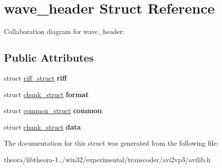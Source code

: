 \hypertarget{structwave__header}{\section{wave\+\_\+header Struct Reference}
\label{structwave__header}
}


Collaboration diagram for wave\+\_\+header\+:
\subsection*{Public Attributes}
\begin{DoxyCompactItemize}
\item 
\hypertarget{structwave__header_a7bcc39762c71ac426cbde1628592a3b0}{struct \hyperlink{structriff__struct}{riff\+\_\+struct} {\bfseries riff}}\label{structwave__header_a7bcc39762c71ac426cbde1628592a3b0}

\item 
\hypertarget{structwave__header_a9ad954d20b73b8a7f30b252fd6962f14}{struct \hyperlink{structchunk__struct}{chunk\+\_\+struct} {\bfseries format}}\label{structwave__header_a9ad954d20b73b8a7f30b252fd6962f14}

\item 
\hypertarget{structwave__header_a468da493bc40d67b163d9e33045c612e}{struct \hyperlink{structcommon__struct}{common\+\_\+struct} {\bfseries common}}\label{structwave__header_a468da493bc40d67b163d9e33045c612e}

\item 
\hypertarget{structwave__header_a69914f046c038e5b16634f82c383661c}{struct \hyperlink{structchunk__struct}{chunk\+\_\+struct} {\bfseries data}}\label{structwave__header_a69914f046c038e5b16634f82c383661c}

\end{DoxyCompactItemize}


The documentation for this struct was generated from the following file\+:\begin{DoxyCompactItemize}
\item 
theora/libtheora-\/1../win32/experimental/transcoder/avi2vp3/avilib.\+h\end{DoxyCompactItemize}
